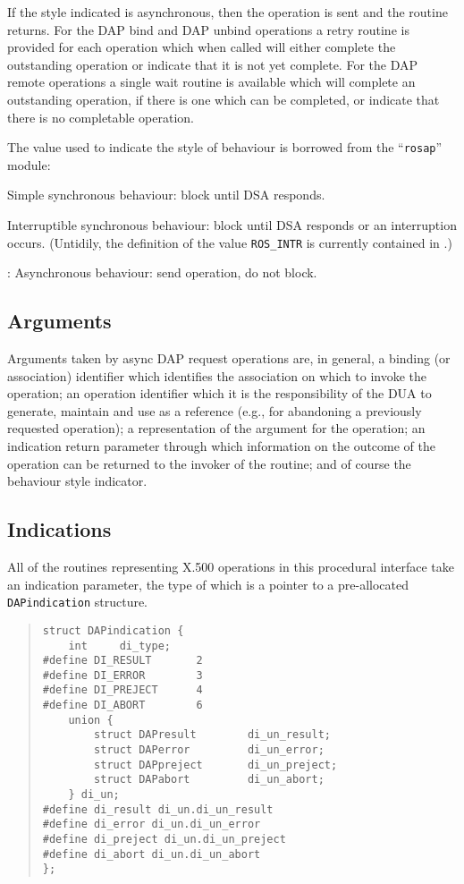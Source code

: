 If the style indicated is asynchronous, then the operation is sent
and the routine returns.
For the DAP bind and DAP unbind operations a retry routine is provided
for each operation which when called will either complete the
outstanding operation or indicate that it is not yet complete.
For the DAP remote operations a single wait routine is available
which will complete an outstanding operation, if there is one which
can be completed, or indicate that there is no completable operation.

The value used to indicate the style of behaviour is borrowed from the
``\verb"rosap"'' module:
\begin{describe}
\item [\verb"ROS\_SYNC":]
Simple synchronous behaviour: block until DSA responds.
\item [\verb"ROS\_INTR":]
Interruptible synchronous behaviour: block until DSA responds or an
interruption occurs. (Untidily, the definition of the value
\verb"ROS_INTR" is currently contained in .)
\item [\verb"ROS\_ASYNC"]:
Asynchronous behaviour: send operation, do not block.
\end{describe}

\subsection {Arguments}

Arguments taken by async DAP request operations are, in general, a
binding (or association) identifier which identifies the association
on which to invoke the operation; an operation identifier which it is
the responsibility of the DUA to generate, maintain and use as a
reference (e.g., for abandoning a previously requested operation);
a representation of the argument for the operation; an indication
return parameter through which information on the outcome of the
operation can be returned to the invoker of the routine; and of course
the behaviour style indicator.

\subsection {Indications}

All of the routines representing X.500 operations in this procedural
interface take an indication parameter, the type of which is a
pointer to a pre-allocated \verb"DAPindication" structure.

\label{DAPindication}
\begin{quote}\small\begin{verbatim}
struct DAPindication {
    int     di_type;
#define DI_RESULT       2
#define DI_ERROR        3
#define DI_PREJECT      4
#define DI_ABORT        6
    union {
        struct DAPresult        di_un_result;
        struct DAPerror         di_un_error;
        struct DAPpreject       di_un_preject;
        struct DAPabort         di_un_abort;
    } di_un;
#define di_result di_un.di_un_result
#define di_error di_un.di_un_error
#define di_preject di_un.di_un_preject
#define di_abort di_un.di_un_abort
};
\end{verbatim}\end{quote}

